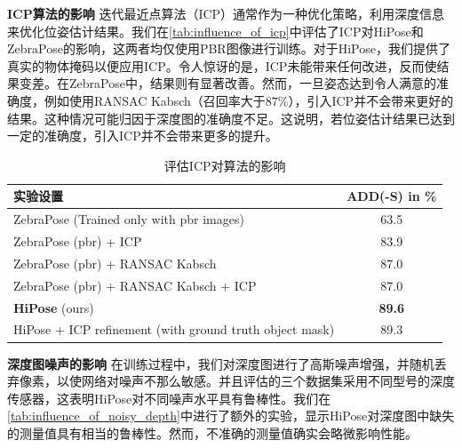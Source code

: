 \textbf{ICP算法的影响 }
迭代最近点算法（ICP）通常作为一种优化策略，利用深度信息来优化位姿估计结果。我们在\autoref{tab:influence_of_icp}中评估了ICP对HiPose和ZebraPose的影响，这两者均仅使用PBR图像进行训练。对于HiPose，我们提供了真实的物体掩码以便应用ICP。令人惊讶的是，ICP未能带来任何改进，反而使结果变差。在ZebraPose中，结果则有显著改善。然而，一旦姿态达到令人满意的准确度，例如使用RANSAC Kabsch（召回率大于$87\%$），引入ICP并不会带来更好的结果。这种情况可能归因于深度图的准确度不足。这说明，若位姿估计结果已达到一定的准确度，引入ICP并不会带来更多的提升。

\begin{table}[h]
    \centering
    \begin{tabular}{@{}l|c@{}}
      \toprule
      实验设置 & ADD(-S) in \% \\
      \midrule
      ZebraPose (Trained only with pbr images) & 63.5\\
      ZebraPose (pbr) + ICP & 83.9\\
      ZebraPose (pbr) + RANSAC Kabsch & 87.0\\
      ZebraPose (pbr) + RANSAC Kabsch + ICP & 87.0\\
      \midrule
      \textbf{HiPose} (ours) &  \textbf{89.6}\\
      HiPose + ICP refinement (with ground truth object mask) &  89.3\\
      \bottomrule
    \end{tabular}
    \caption{评估ICP对算法的影响}
    \label{tab:influence_of_icp}
  \end{table}

\textbf{深度图噪声的影响 }
在训练过程中，我们对深度图进行了高斯噪声增强，并随机丢弃像素，以使网络对噪声不那么敏感。并且评估的三个数据集采用不同型号的深度传感器，这表明HiPose对不同噪声水平具有鲁棒性。我们在\autoref{tab:influence_of_noisy_depth}中进行了额外的实验，显示HiPose对深度图中缺失的测量值具有相当的鲁棒性。然而，不准确的测量值确实会略微影响性能。

\begin{table}[h]
    \centering
    \caption{深度图噪声对结果的影响}
    \label{tab:influence_of_noisy_depth}
\end{table}

